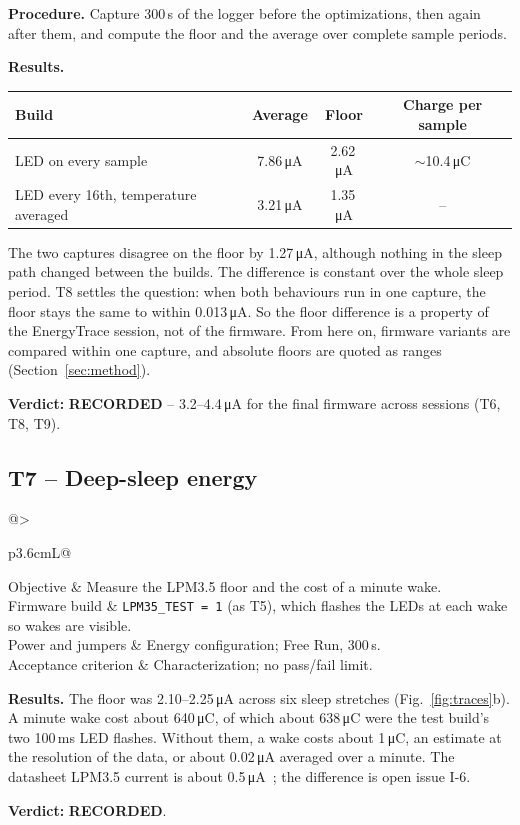 \documentclass[11pt,a4paper]{article}
\makeatletter
\newcommand{\uA}{\,\si{\micro\ampere}}
\newcommand{\uC}{\,\si{\micro\coulomb}}
\newcommand{\code}[1]{\texttt{#1}}
\newcommand{\recorded}{\textbf{\textcolor{blue!60!black}{RECORDED}}}
\newcommand{\testcase}[7]{%
  \subsection{#1 -- #2}\label{#3}
  \noindent\begin{tabularx}{\textwidth}{@{}>{\raggedright\arraybackslash\bfseries}p{3.6cm}L@{}}
  \toprule
  Objective & #4 \\
  Firmware build & #5 \\
  Power and jumpers & #6 \\
  Acceptance criterion & #7 \\
  \bottomrule
  \end{tabularx}\par\medskip}
\makeatother
\begin{document}
\textbf{Procedure.} Capture 300\,s of the logger before the optimizations, then again after them, and compute the floor and the average over complete sample periods.

\textbf{Results.}
\begin{table}[H]
\centering\small
\begin{tabular}{@{}lccc@{}}
\toprule
Build & Average & Floor & Charge per sample \\
\midrule
LED on every sample & 7.86\uA & 2.62\uA & $\sim$10.4\uC \\
LED every 16th, temperature averaged & 3.21\uA & 1.35\uA & -- \\
\bottomrule
\end{tabular}
\end{table}

The two captures disagree on the floor by 1.27\uA, although nothing in the sleep path changed between the builds. The difference is constant over the whole sleep period. T8 settles the question: when both behaviours run in one capture, the floor stays the same to within 0.013\uA. So the floor difference is a property of the EnergyTrace session, not of the firmware. From here on, firmware variants are compared within one capture, and absolute floors are quoted as ranges (Section~\ref{sec:method}).

\textbf{Verdict:} \recorded{} -- 3.2--4.4\uA{} for the final firmware across sessions (T6, T8, T9).

\testcase{T7}{Deep-sleep energy}{t:lpm35e}
  {Measure the LPM3.5 floor and the cost of a minute wake.}
  {\code{LPM35\_TEST = 1} (as T5), which flashes the LEDs at each wake so wakes are visible.}
  {Energy configuration; Free Run, 300\,s.}
  {Characterization; no pass/fail limit.}

\textbf{Results.} The floor was 2.10--2.25\uA{} across six sleep stretches (Fig.~\ref{fig:traces}b). A minute wake cost about 640\uC, of which about 638\uC{} were the test build's two 100\,ms LED flashes. Without them, a wake costs about 1\uC, an estimate at the resolution of the data, or about 0.02\uA{} averaged over a minute. The datasheet LPM3.5 current is about 0.5\uA~\cite{ti_slase54}; the difference is open issue I-6.

\textbf{Verdict:} \recorded.
\end{document}
